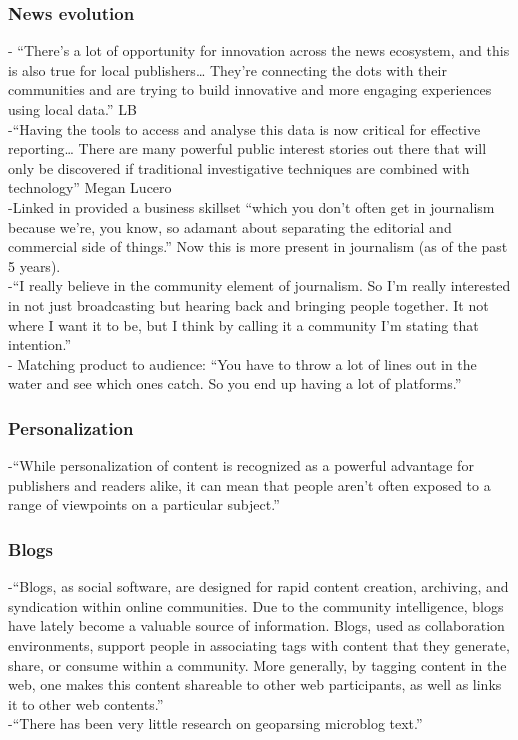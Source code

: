 \subsubsection{News evolution}
-{\color{orange} “There’s a lot of opportunity for innovation across the news ecosystem, and this is also true for local publishers… They’re connecting the dots with their communities and are trying to build innovative and more engaging experiences using local data.” LB\cite{DNIFund2018}}\\
-{\color{orange}“Having the tools to access and analyse this data is now critical for effective reporting… There are many powerful public interest stories out there that will only be discovered if traditional investigative techniques are combined with technology” Megan Lucero \cite{DNIFund2018}}\\
-{\color{orange}Linked in provided a business skillset “which you don’t often get in journalism because we’re, you know, so adamant about separating the editorial and commercial side of things.” Now this is more present in journalism (as of the past 5 years).\cite{Granger2020a}}\\
-{\color{orange}“I really believe in the community element of journalism. So I’m really interested in not just broadcasting but hearing back and bringing people together. It not where I want it to be, but I think by calling it a community I’m stating that intention.”\cite{Granger2020a}}\\
-{\color{orange} Matching product to audience: “You have to throw a lot of lines out in the water and see which ones catch. So you end up having a lot of platforms.”\cite{Granger2020a}}\\

\subsubsection{Personalization}
-{\color{orange}“While personalization of content is recognized as a powerful advantage for publishers and readers alike, it can mean that people aren’t often exposed to a range of viewpoints on a particular subject.''\cite{DNIFund2018}}\\

\subsubsection{Blogs}
-{\color{orange}“Blogs, as social software, are designed for rapid content creation, archiving, and syndication within online communities. Due to the community intelligence, blogs have lately become a valuable source of information. Blogs, used as collaboration environments, support people in associating tags with content that they generate, share, or consume within a community. More generally, by tagging content in the web, one makes this content shareable to other web participants, as well as links it to other web contents.” }\cite{Xing2015}\\
-{\color{orange}“There has been very little research on geoparsing microblog text.”\cite{Karimzadeh2019a}}\\

